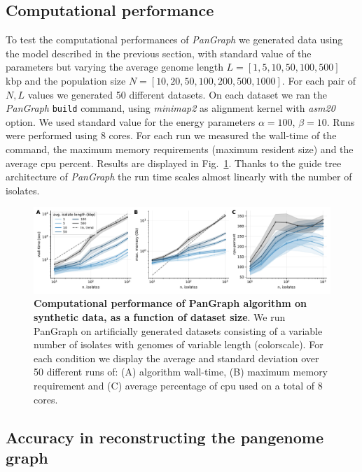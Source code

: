 \documentclass[aps,rmp,reprint,superscriptaddress,notitlepage,10pt,onecolumn]{revtex4-1}
\begin{document}
\subsection{Computational performance}

To test the computational performances of \textit{PanGraph} we generated data using the model described in the previous section, with standard value of the parameters but varying the average genome length $L=[1,5,10,50,100,500]$ kbp and the population size $N=[10,20,50,100,200,500,1000]$. For each pair of $N,L$ values we generated 50 different datasets. On each dataset we ran the \textit{PanGraph} \verb|build| command, using \textit{minimap2} as alignment kernel with \textit{asm20} option. We used standard value for the energy parameters $\alpha=100$, $\beta=10$. Runs were performed using 8 cores. For each run we measured the wall-time of the command, the maximum memory requirements (maximum resident size) and the average cpu percent. Results are displayed in Fig.~\ref{fig:benchmark-perf-suppl}.
Thanks to the guide tree architecture of \textit{PanGraph} the run time scales almost linearly with the number of isolates.

\begin{figure}[htb]
    \includegraphics[width=.9\textwidth]{figs_suppl/benchmark_suppl.pdf}
    \caption{{\bf Computational performance of PanGraph algorithm on synthetic data, as a function of dataset size}. We run PanGraph on artificially generated datasets consisting of a variable number of isolates with genomes of variable length (colorscale). For each condition we display the average and standard deviation over 50 different runs of: (A) algorithm wall-time, (B) maximum memory requirement and (C) average percentage of cpu used on a total of 8 cores.}
    \label{fig:benchmark-perf-suppl}
\end{figure}


\subsection{Accuracy in reconstructing the pangenome graph}
\end{document}
